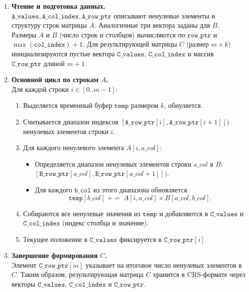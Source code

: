 \documentclass[12pt]{article}
\begin{document}
\begin{enumerate}
    \item \textbf{Чтение и подготовка данных.}\\
    \(\texttt{A\_values}, \texttt{A\_col\_index}, \texttt{A\_row\_ptr}\) описывают ненулевые элементы и структуру строк матрицы \(A\). Аналогичные три вектора заданы для \(B\). Размеры \(A\) и \(B\) (число строк и столбцов) вычисляются по \(\texttt{row\_ptr}\) и \(\max(\texttt{col\_index}) + 1\). Для результирующей матрицы \(C\) (размер \(m \times k\)) инициализируются пустые вектора \(\texttt{C\_values}\), \(\texttt{C\_col\_index}\) и массив \(\texttt{C\_row\_ptr}\) длиной \(m+1\).

    \item \textbf{Основной цикл по строкам \(A\).}\\
    Для каждой строки \(i \in [0..m-1]\):
    \begin{enumerate}
        \item Выделяется временный буфер \(\texttt{temp}\) размером \(k\), обнуляется.
        \item Считывается диапазон индексов \([\texttt{A\_row\_ptr}[i], \texttt{A\_row\_ptr}[i+1]])\) ненулевых элементов строки \(i\).
        \item Для каждого ненулевого элемента \(A[i,a\_col]\):
        \begin{itemize}
            \item Определяется диапазон ненулевых элементов строки \(a\_col\) в \(B\): \([\texttt{B\_row\_ptr}[a\_col], \texttt{B\_row\_ptr}[a\_col + 1]])\).
            \item Для каждого \(\texttt{b\_col}\) из этого диапазона обновляется 
            \[
            \texttt{temp}[b\_col] \;{+}{=}\; A[i,a\_col] \times B[a\_col,b\_col].
            \]
        \end{itemize}
        \item Собираются все ненулевые значения из \(\texttt{temp}\) и добавляются в \(\texttt{C\_values}\) и \(\texttt{C\_col\_index}\) (индекс столбца и значение).
        \item Текущее положение в \(\texttt{C\_values}\) фиксируется в \(\texttt{C\_row\_ptr}[i]\).
    \end{enumerate}

    \item \textbf{Завершение формирования \(C\).}\\
    Элемент \(\texttt{C\_row\_ptr}[m]\) указывает на итоговое число ненулевых элементов в \(C\). Таким образом, результирующая матрица \(C\) хранится в CRS-формате через векторы \(\texttt{C\_values}\), \(\texttt{C\_col\_index}\) и \(\texttt{C\_row\_ptr}\).
\end{enumerate}
\end{document}
